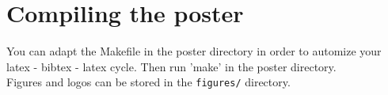 \section*{Compiling the poster}
You can adapt the Makefile in the poster directory in order to
automize your latex - bibtex - latex cycle. Then run 'make' in the
poster directory.\\

Figures and logos can be stored in the \verb|figures/| directory.
